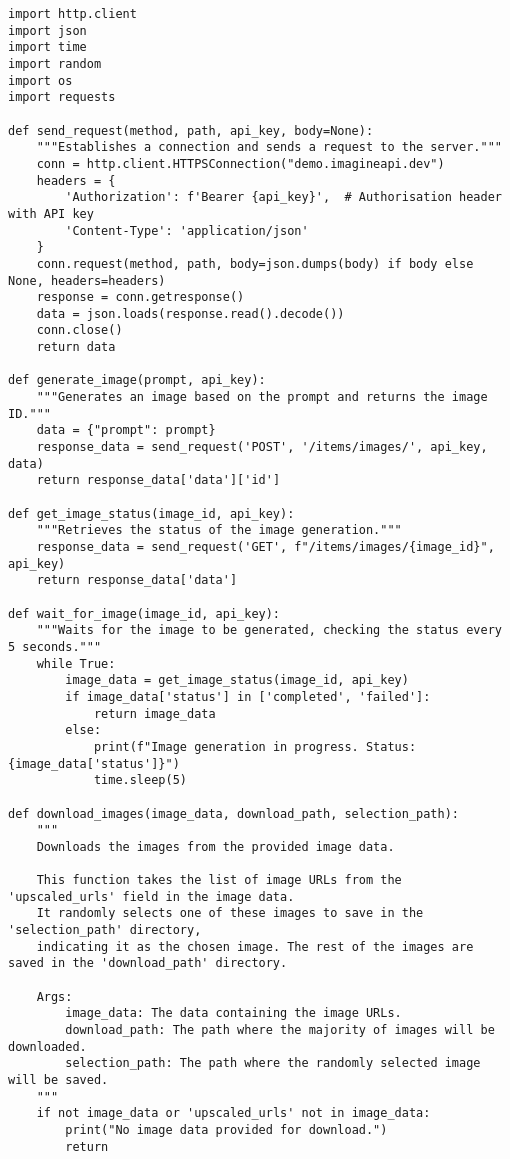\begin{lstlisting}
import http.client
import json
import time
import random
import os
import requests

def send_request(method, path, api_key, body=None):
    """Establishes a connection and sends a request to the server."""
    conn = http.client.HTTPSConnection("demo.imagineapi.dev")
    headers = {
        'Authorization': f'Bearer {api_key}',  # Authorisation header with API key
        'Content-Type': 'application/json'
    }
    conn.request(method, path, body=json.dumps(body) if body else None, headers=headers)
    response = conn.getresponse()
    data = json.loads(response.read().decode())
    conn.close()
    return data

def generate_image(prompt, api_key):
    """Generates an image based on the prompt and returns the image ID."""
    data = {"prompt": prompt}
    response_data = send_request('POST', '/items/images/', api_key, data)
    return response_data['data']['id']

def get_image_status(image_id, api_key):
    """Retrieves the status of the image generation."""
    response_data = send_request('GET', f"/items/images/{image_id}", api_key)
    return response_data['data']

def wait_for_image(image_id, api_key):
    """Waits for the image to be generated, checking the status every 5 seconds."""
    while True:
        image_data = get_image_status(image_id, api_key)
        if image_data['status'] in ['completed', 'failed']:
            return image_data
        else:
            print(f"Image generation in progress. Status: {image_data['status']}")
            time.sleep(5)

def download_images(image_data, download_path, selection_path):
    """
    Downloads the images from the provided image data.
    
    This function takes the list of image URLs from the 'upscaled_urls' field in the image data.
    It randomly selects one of these images to save in the 'selection_path' directory, 
    indicating it as the chosen image. The rest of the images are saved in the 'download_path' directory.

    Args:
        image_data: The data containing the image URLs.
        download_path: The path where the majority of images will be downloaded.
        selection_path: The path where the randomly selected image will be saved.
    """
    if not image_data or 'upscaled_urls' not in image_data:
        print("No image data provided for download.")
        return


\end{lstlisting}
